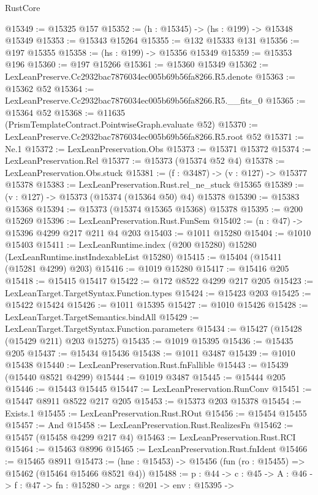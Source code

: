\begin{lexlean}{RustCore}
\begin{coremodule}
@15349 := @15325 @157
@15352 := (h : @15345) -> (hs : @199) -> @15348 @15349
@15353 := @15343 @15264
@15355 := @132 @15333 @131
@15356 := @197 @15355
@15358 := (hs : @199) -> @15356 @15349
@15359 := @15353 @196
@15360 := @197 @15266
@15361 := @15360 @15349
@15362 := LexLeanPreserve.Cc2932bac7876034ec005b69b56fa8266.R5.denote
@15363 := @15362 @52
@15364 := LexLeanPreserve.Cc2932bac7876034ec005b69b56fa8266.R5.__fits_0
@15365 := @15364 @52
@15368 := @11635 (PrismTemplateContract.PointwiseGraph.evaluate @52)
@15370 := LexLeanPreserve.Cc2932bac7876034ec005b69b56fa8266.R5.root @52
@15371 := Ne.{1}
@15372 := LexLeanPreservation.Obs
@15373 := @15371 @15372
@15374 := LexLeanPreservation.Rel
@15377 := @15373 (@15374 @52 @4)
@15378 := LexLeanPreservation.Obs.stuck
@15381 := (f : @3487) -> (v : @127) -> @15377 @15378
@15383 := LexLeanPreservation.Rust.rel_ne_stuck @15365
@15389 := (v : @127) -> @15373 (@15374 (@15364 @50) @4) @15378
@15390 := @15383 @15368
@15394 := @15373 (@15374 @15365 @15368) @15378
@15395 := @200 @15269
@15396 := LexLeanPreservation.Rust.FunSem
@15402 := (n : @47) -> @15396 @4299 @217 @211 @4 @203
@15403 := @1011 @15280
@15404 := @1010 @15403
@15411 := LexLeanRuntime.index (@200 @15280) @15280 (LexLeanRuntime.instIndexableList @15280)
@15415 := @15404 (@15411 (@15281 @4299) @203)
@15416 := @1019 @15280
@15417 := @15416 @205
@15418 := @15415 @15417
@15422 := @172 @8522 @4299 @217 @205
@15423 := LexLeanTarget.TargetSyntax.Function.types
@15424 := @15423 @203
@15425 := @15422 @15424
@15426 := @1011 @15395
@15427 := @1010 @15426
@15428 := LexLeanTarget.TargetSemantics.bindAll
@15429 := LexLeanTarget.TargetSyntax.Function.parameters
@15434 := @15427 (@15428 (@15429 @211) @203 @15275)
@15435 := @1019 @15395
@15436 := @15435 @205
@15437 := @15434 @15436
@15438 := @1011 @3487
@15439 := @1010 @15438
@15440 := LexLeanPreservation.Rust.fnFallible
@15443 := @15439 (@15440 @8521 @4299)
@15444 := @1019 @3487
@15445 := @15444 @205
@15446 := @15443 @15445
@15447 := LexLeanPreservation.RunConv
@15451 := @15447 @8911 @8522 @217 @205
@15453 := @15373 @203 @15378
@15454 := Exists.{1}
@15455 := LexLeanPreservation.Rust.ROut
@15456 := @15454 @15455
@15457 := And
@15458 := LexLeanPreservation.Rust.RealizesFn
@15462 := @15457 (@15458 @4299 @217 @4)
@15463 := LexLeanPreservation.Rust.RCI
@15464 := @15463 @8996
@15465 := LexLeanPreservation.Rust.fnIdent
@15466 := @15465 @8911
@15473 := (hne : @15453) -> @15456 (fun (ro : @15455) => @15462 (@15464 @15466 @8521 @4))
@15488 := {p : @44} ->
  {c : @45} ->
  {A : @46} ->
  {f : @47} ->
  {fn : @15280} ->
  {args : @201} ->
  {env : @15395} ->

\end{coremodule}
\end{lexlean}
